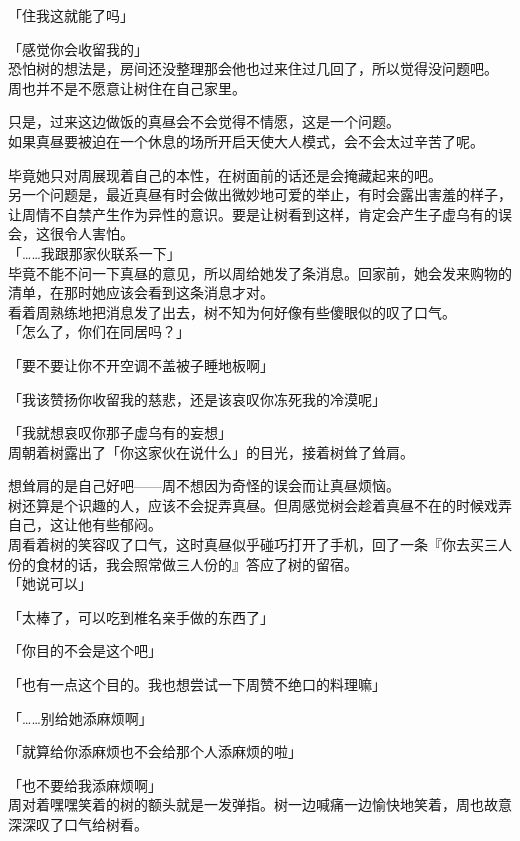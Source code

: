 「住我这就能了吗」

「感觉你会收留我的」\\

恐怕树的想法是，房间还没整理那会他也过来住过几回了，所以觉得没问题吧。\\

周也并不是不愿意让树住在自己家里。

只是，过来这边做饭的真昼会不会觉得不情愿，这是一个问题。\\

如果真昼要被迫在一个休息的场所开启天使大人模式，会不会太过辛苦了呢。

毕竟她只对周展现着自己的本性，在树面前的话还是会掩藏起来的吧。\\

另一个问题是，最近真昼有时会做出微妙地可爱的举止，有时会露出害羞的样子，让周情不自禁产生作为异性的意识。要是让树看到这样，肯定会产生子虚乌有的误会，这很令人害怕。\\

「……我跟那家伙联系一下」\\

毕竟不能不问一下真昼的意见，所以周给她发了条消息。回家前，她会发来购物的清单，在那时她应该会看到这条消息才对。\\

看着周熟练地把消息发了出去，树不知为何好像有些傻眼似的叹了口气。\\

「怎么了，你们在同居吗？」

「要不要让你不开空调不盖被子睡地板啊」

「我该赞扬你收留我的慈悲，还是该哀叹你冻死我的冷漠呢」

「我就想哀叹你那子虚乌有的妄想」\\

周朝着树露出了「你这家伙在说什么」的目光，接着树耸了耸肩。

想耸肩的是自己好吧——周不想因为奇怪的误会而让真昼烦恼。\\

树还算是个识趣的人，应该不会捉弄真昼。但周感觉树会趁着真昼不在的时候戏弄自己，这让他有些郁闷。\\

周看着树的笑容叹了口气，这时真昼似乎碰巧打开了手机，回了一条『你去买三人份的食材的话，我会照常做三人份的』答应了树的留宿。\\

「她说可以」

「太棒了，可以吃到椎名亲手做的东西了」

「你目的不会是这个吧」

「也有一点这个目的。我也想尝试一下周赞不绝口的料理嘛」

「……别给她添麻烦啊」

「就算给你添麻烦也不会给那个人添麻烦的啦」

「也不要给我添麻烦啊」\\

周对着嘿嘿笑着的树的额头就是一发弹指。树一边喊痛一边愉快地笑着，周也故意深深叹了口气给树看。
